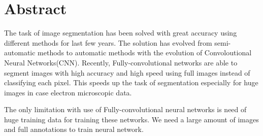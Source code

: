 %

\newpage
\vspace{3cm}

\chapter*{Abstract}
The task of image segmentation has been solved with great accuracy using different methods for last few years. The solution has evolved from semi-automatic methods to automatic methods with the evolution of Convoloutional Neural Networks(CNN). Recently, Fully-convolutional networks are able to segment images with high accuracy and high speed using full images instead of classifying each pixel. This speeds up the task of segmentation especially for huge images in case electron microscopic data.
\par The only limitation with use of Fully-convolutional neural networks is need of huge training data for training these networks. We need a large amount of images and full annotations to train neural network.

